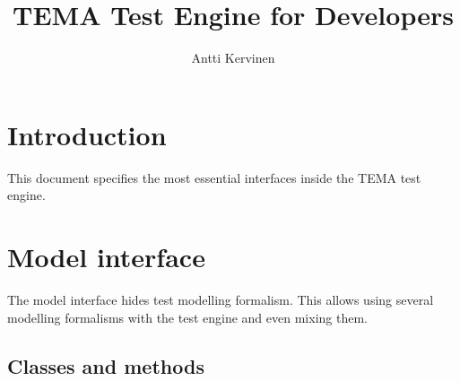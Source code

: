 \documentclass{article}
\title{TEMA Test Engine for Developers}
\author{Antti Kervinen}
\begin{document}
\newcommand{\modulename}[1]{\texttt{#1}}
\newcommand{\classname}[1]{\textsc{\texttt{#1}}}
\newcommand{\methodname}[1]{\textbf{\texttt{#1}}}
\newcommand{\spec}[1]{\textbf{#1}}
\newenvironment{quot}{\begin{quote}\vspace{-3mm}}{\end{quote}}
\newcommand{\note}[1]{\flushleft\small\fbox{\begin{minipage}{0.8\linewidth}#1\end{minipage}}}


\section{Introduction}

This document specifies the most essential interfaces inside the TEMA
test engine.

\section{Model interface}

The model interface hides test modelling formalism. This allows using
several modelling formalisms with the test engine and even mixing
them.

\subsection{Classes and methods}
\end{document}
